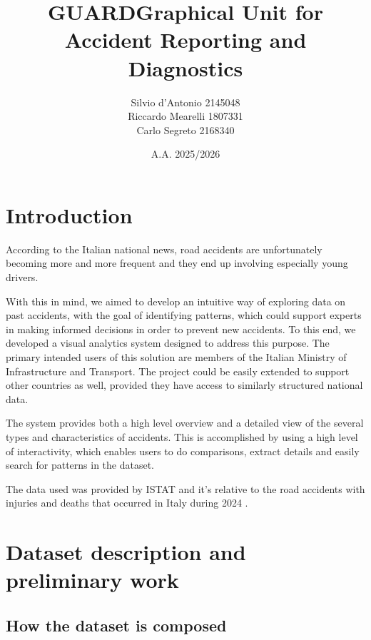\documentclass[12pt]{article}
\begin{document}
\author{Silvio d'Antonio 2145048\\ Riccardo Mearelli 1807331 \\Carlo Segreto 2168340}
\title{GUARD\medbreak \normalsize Graphical Unit for Accident Reporting and Diagnostics}
\date{A.A. 2025/2026}
\maketitle
\newpage
\tableofcontents
\newpage

\section{Introduction}
According to the Italian national news, road accidents are unfortunately becoming more and more frequent and they end up involving especially young drivers.

With this in mind, we aimed to develop an intuitive way of exploring data on past accidents, with the goal of identifying patterns, which could support experts in making informed decisions in order to prevent new accidents. To this end, we developed a visual analytics system designed to address this purpose. The primary intended users of this solution are members of the Italian Ministry of Infrastructure and Transport. The project could be easily extended to support other countries as well, provided they have access to similarly structured national data.

The system provides both a high level overview and a detailed view of the several types and characteristics of accidents. This is accomplished by using a high level of interactivity, which enables users to do comparisons, extract details and easily search for patterns in the dataset.

The data used was provided by ISTAT and it's relative to the road accidents with injuries and deaths that occurred in Italy during 2024 \cite{dataset}.

\section{Dataset description and preliminary work}

\subsection{How the dataset is composed}
\end{document}
